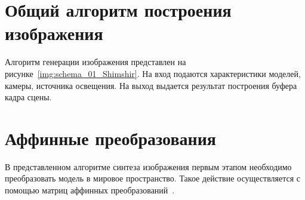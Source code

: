 \section{Общий алгоритм построения изображения}

Алгоритм генерации изображения представлен на рисунке~\ref{img:schema_01_Shimshir}.
На вход подаются характеристики моделей, камеры, источника освещения.
На выход выдается результат построения буфера кадра сцены.


\section{Аффинные преобразования}

В представленном алгоритме синтеза изображения первым этапом необходимо преобразовать модель в мировое пространство. 
Такое действие осуществляется с помощью матриц аффинных преобразований~\cite{porevcg}.

